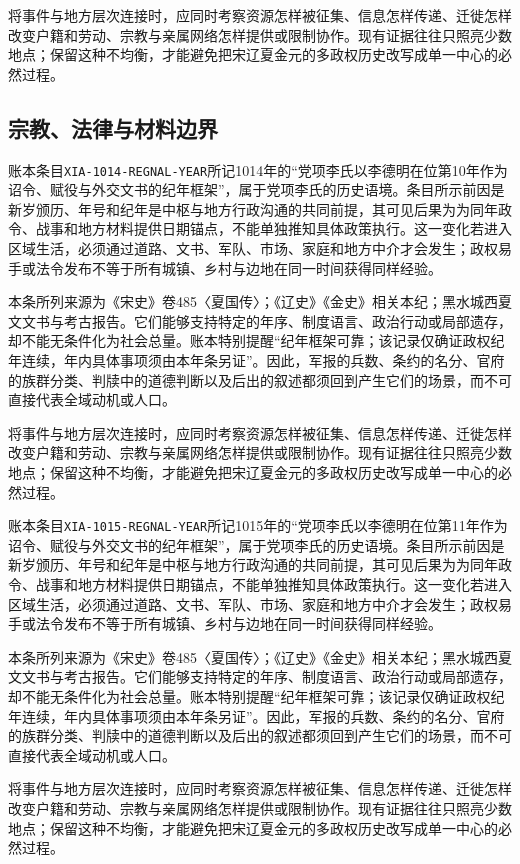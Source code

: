 将事件与地方层次连接时，应同时考察资源怎样被征集、信息怎样传递、迁徙怎样改变户籍和劳动、宗教与亲属网络怎样提供或限制协作。现有证据往往只照亮少数地点；保留这种不均衡，才能避免把宋辽夏金元的多政权历史改写成单一中心的必然过程。

\subsection{宗教、法律与材料边界}

账本条目\texttt{XIA-1014-REGNAL-YEAR}所记1014年的“党项李氏以李德明在位第10年作为诏令、赋役与外交文书的纪年框架”，属于党项李氏的历史语境。条目所示前因是新岁颁历、年号和纪年是中枢与地方行政沟通的共同前提，其可见后果为为同年政令、战事和地方材料提供日期锚点，不能单独推知具体政策执行。这一变化若进入区域生活，必须通过道路、文书、军队、市场、家庭和地方中介才会发生；政权易手或法令发布不等于所有城镇、乡村与边地在同一时间获得同样经验。

本条所列来源为《宋史》卷485〈夏国传〉；《辽史》《金史》相关本纪；黑水城西夏文文书与考古报告。它们能够支持特定的年序、制度语言、政治行动或局部遗存，却不能无条件化为社会总量。账本特别提醒“纪年框架可靠；该记录仅确证政权纪年连续，年内具体事项须由本年条另证”。因此，军报的兵数、条约的名分、官府的族群分类、判牍中的道德判断以及后出的叙述都须回到产生它们的场景，而不可直接代表全域动机或人口。

将事件与地方层次连接时，应同时考察资源怎样被征集、信息怎样传递、迁徙怎样改变户籍和劳动、宗教与亲属网络怎样提供或限制协作。现有证据往往只照亮少数地点；保留这种不均衡，才能避免把宋辽夏金元的多政权历史改写成单一中心的必然过程。

账本条目\texttt{XIA-1015-REGNAL-YEAR}所记1015年的“党项李氏以李德明在位第11年作为诏令、赋役与外交文书的纪年框架”，属于党项李氏的历史语境。条目所示前因是新岁颁历、年号和纪年是中枢与地方行政沟通的共同前提，其可见后果为为同年政令、战事和地方材料提供日期锚点，不能单独推知具体政策执行。这一变化若进入区域生活，必须通过道路、文书、军队、市场、家庭和地方中介才会发生；政权易手或法令发布不等于所有城镇、乡村与边地在同一时间获得同样经验。

本条所列来源为《宋史》卷485〈夏国传〉；《辽史》《金史》相关本纪；黑水城西夏文文书与考古报告。它们能够支持特定的年序、制度语言、政治行动或局部遗存，却不能无条件化为社会总量。账本特别提醒“纪年框架可靠；该记录仅确证政权纪年连续，年内具体事项须由本年条另证”。因此，军报的兵数、条约的名分、官府的族群分类、判牍中的道德判断以及后出的叙述都须回到产生它们的场景，而不可直接代表全域动机或人口。

将事件与地方层次连接时，应同时考察资源怎样被征集、信息怎样传递、迁徙怎样改变户籍和劳动、宗教与亲属网络怎样提供或限制协作。现有证据往往只照亮少数地点；保留这种不均衡，才能避免把宋辽夏金元的多政权历史改写成单一中心的必然过程。

